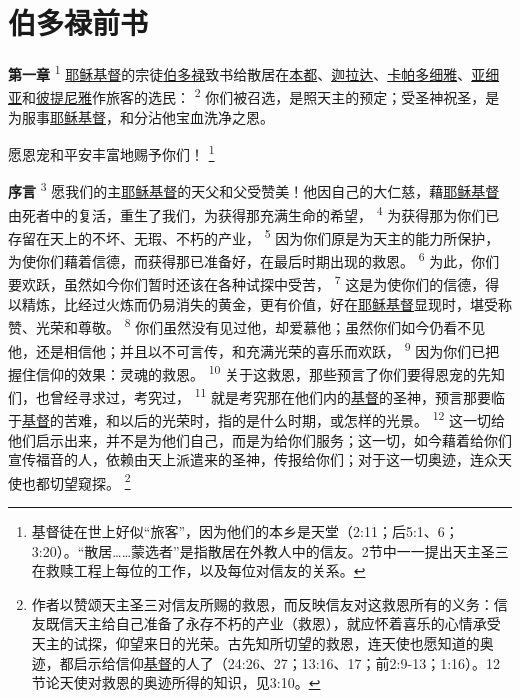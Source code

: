 \chapter*{伯多禄前书}


\textbf{第一章\quad}
\textsuperscript{1}
\uline{耶稣}\uline{基督}的宗徒\uline{伯多禄}致书给散居在\uline{本都}、\uline{迦拉达}、\uline{卡帕多细雅}、\uline{亚细亚}和\uline{彼提尼雅}作旅客的选民：
\textsuperscript{2}
你们被召选，是照天主的预定；受圣神祝圣，是为服事\uline{耶稣}\uline{基督}，和分沾他宝血洗净之恩。

愿恩宠和平安丰富地赐予你们！
\footnote{基督徒在世上好似“旅客”，因为他们的本乡是天堂（2:11；后5:1、6；3:20）。“散居……蒙选者”是指散居在外教人中的信友。2节中一一提出天主圣三在救赎工程上每位的工作，以及每位对信友的关系。}

\textbf{序言\quad}
\textsuperscript{3}
愿我们的主\uline{耶稣}\uline{基督}的天父和父受赞美！他因自己的大仁慈，藉\uline{耶稣}\uline{基督}由死者中的复活，重生了我们，为获得那充满生命的希望，
\textsuperscript{4}
为获得那为你们已存留在天上的不坏、无瑕、不朽的产业，
\textsuperscript{5}
因为你们原是为天主的能力所保护，为使你们藉着信德，而获得那已准备好，在最后时期出现的救恩。
\textsuperscript{6}
为此，你们要欢跃，虽然如今你们暂时还该在各种试探中受苦，
\textsuperscript{7}
这是为使你们的信德，得以精炼，比经过火炼而仍易消失的黄金，更有价值，好在\uline{耶稣}\uline{基督}显现时，堪受称赞、光荣和尊敬。
\textsuperscript{8}
你们虽然没有见过他，却爱慕他；虽然你们如今仍看不见他，还是相信他；并且以不可言传，和充满光荣的喜乐而欢跃，
\textsuperscript{9}
因为你们已把握住信仰的效果：灵魂的救恩。
\textsuperscript{10}
关于这救恩，那些预言了你们要得恩宠的先知们，也曾经寻求过，考究过，
\textsuperscript{11}
就是考究那在他们内的\uline{基督}的圣神，预言那要临于\uline{基督}的苦难，和以后的光荣时，指的是什么时期，或怎样的光景。
\textsuperscript{12}
这一切给他们启示出来，并不是为他们自己，而是为给你们服务；这一切，如今藉着给你们宣传福音的人，依赖由天上派遣来的圣神，传报给你们；对于这一切奥迹，连众天使也都切望窥探。
\footnote{作者以赞颂天主圣三对信友所赐的救恩，而反映信友对这救恩所有的义务：信友既信天主给自己准备了永存不朽的产业（救恩），就应怀着喜乐的心情承受天主的试探，仰望来日的光荣。古先知所切望的救恩，连天使也愿知道的奥迹，都启示给信仰\uline{基督}的人了（24:26、27；13:16、17；前2:9-13；1:16）。12节论天使对救恩的奥迹所得的知识，见3:10。}

